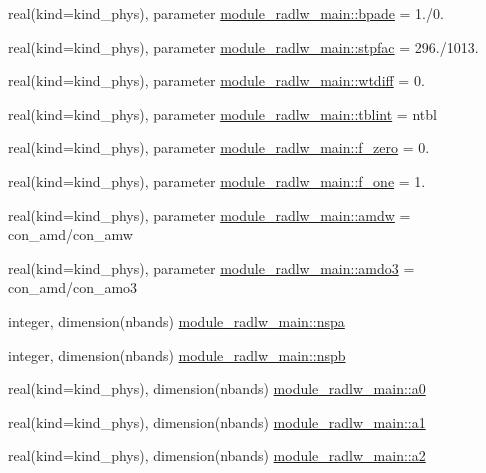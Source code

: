 \begin{DoxyCompactItemize}
\item 
real(kind=kind\+\_\+phys), parameter \hyperlink{group__module__radlw__main_ga5c63b9836ad5735dd3d0811ff527c41c}{module\+\_\+radlw\+\_\+main\+::bpade} = 1./0.
\item 
real(kind=kind\+\_\+phys), parameter \hyperlink{group__module__radlw__main_ga483b88df2bdada7ef349d9530f91b762}{module\+\_\+radlw\+\_\+main\+::stpfac} = 296./1013.
\item 
real(kind=kind\+\_\+phys), parameter \hyperlink{group__module__radlw__main_gaf1a0ca36bfce779493a7d1a4b81f6f73}{module\+\_\+radlw\+\_\+main\+::wtdiff} = 0.
\item 
real(kind=kind\+\_\+phys), parameter \hyperlink{group__module__radlw__main_gaf6b84954042db7b1e2a6abdb4d401ccf}{module\+\_\+radlw\+\_\+main\+::tblint} = ntbl
\item 
real(kind=kind\+\_\+phys), parameter \hyperlink{group__module__radlw__main_ga9b8f65236249b31c8f9fcf1cfd0e7baa}{module\+\_\+radlw\+\_\+main\+::f\+\_\+zero} = 0.
\item 
real(kind=kind\+\_\+phys), parameter \hyperlink{group__module__radlw__main_ga518605a1451822f1888c6c7e85e07328}{module\+\_\+radlw\+\_\+main\+::f\+\_\+one} = 1.
\item 
real(kind=kind\+\_\+phys), parameter \hyperlink{group__module__radlw__main_ga9845c3a6eaa014e6a310fe1436162e37}{module\+\_\+radlw\+\_\+main\+::amdw} = con\+\_\+amd/con\+\_\+amw
\item 
real(kind=kind\+\_\+phys), parameter \hyperlink{group__module__radlw__main_ga06f62c34722a3d7dcec9b5643d78f039}{module\+\_\+radlw\+\_\+main\+::amdo3} = con\+\_\+amd/con\+\_\+amo3
\item 
integer, dimension(nbands) \hyperlink{group__module__radlw__main_ga42bbf62b5d91586f17d352af74e3c032}{module\+\_\+radlw\+\_\+main\+::nspa}
\item 
integer, dimension(nbands) \hyperlink{group__module__radlw__main_ga520be8a7f308d9e2c8e88b185170404e}{module\+\_\+radlw\+\_\+main\+::nspb}
\item 
real(kind=kind\+\_\+phys), dimension(nbands) \hyperlink{group__module__radlw__main_gae55000724e738b7a5b7be4c8cef07553}{module\+\_\+radlw\+\_\+main\+::a0}
\item 
real(kind=kind\+\_\+phys), dimension(nbands) \hyperlink{group__module__radlw__main_gaeba888f00b19a65460f3b587c60ea4a0}{module\+\_\+radlw\+\_\+main\+::a1}
\item 
real(kind=kind\+\_\+phys), dimension(nbands) \hyperlink{group__module__radlw__main_ga1b4681c9bcc9434e30fef0ca4aaa9dcd}{module\+\_\+radlw\+\_\+main\+::a2}

\end{DoxyCompactItemize}
